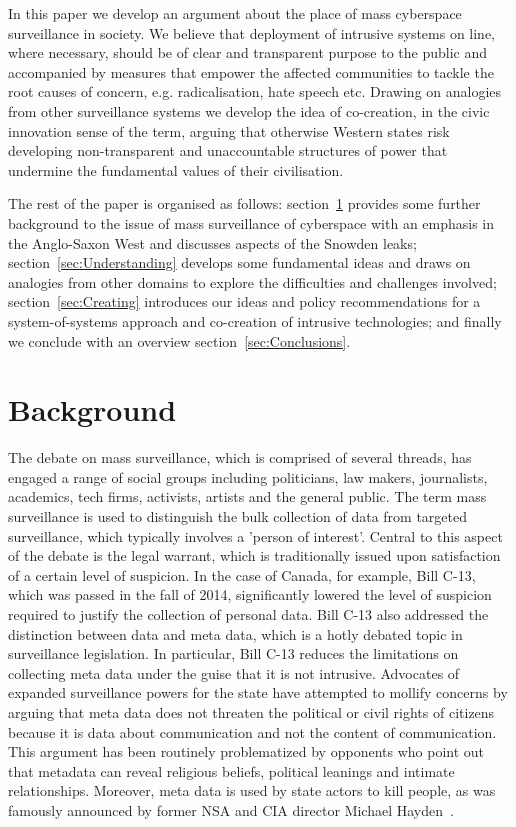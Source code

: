 \documentclass{llncs}
\begin{document}
In this paper we develop an argument about the place of mass cyberspace surveillance in society. We believe that deployment of intrusive systems on line, where necessary, should be of clear and transparent purpose to the public and accompanied by measures that empower the affected communities to tackle the root causes of concern, e.g. radicalisation, hate speech etc. Drawing on analogies from other surveillance systems we develop the idea of co-creation, in the civic innovation sense of the term, arguing that otherwise Western states risk developing non-transparent and unaccountable structures of power that undermine the fundamental values of their civilisation.

The rest of the paper is organised as follows: section~\ref{sec:Background} provides some further background to the issue of mass surveillance of cyberspace with an emphasis in the Anglo-Saxon West and discusses aspects of the Snowden leaks; section~\ref{sec:Understanding} develops some fundamental ideas and draws on analogies from other domains to explore the difficulties and challenges involved; section~\ref{sec:Creating} introduces our ideas and policy recommendations for a system-of-systems approach and co-creation of intrusive technologies; and finally we conclude with an overview section~\ref{sec:Conclusions}.

\section{Background}
\label{sec:Background}
The debate on mass surveillance, which is comprised of several threads, has engaged a range of social groups including politicians, law makers, journalists, academics, tech firms, activists, artists and the general public. The term mass surveillance is used to distinguish the bulk collection of data from targeted surveillance, which typically involves a 'person of interest'. Central to this aspect of the debate is the legal warrant, which is traditionally issued upon satisfaction of a certain level of suspicion. In the case of Canada, for example, Bill C-13, which was passed in the fall of 2014, significantly lowered the level of suspicion required to justify the collection of personal data. Bill C-13 also addressed the distinction between data and meta data, which is a hotly debated topic in surveillance legislation. In particular, Bill C-13 reduces the limitations on collecting meta data under the guise that it is not intrusive. Advocates of expanded surveillance powers for the state have attempted to mollify concerns by arguing that meta data does not threaten the political or civil rights of citizens because it is data about communication and not the content of communication. This argument has been routinely problematized by opponents who point out that metadata can reveal religious beliefs, political leanings and intimate relationships. Moreover, meta data is used by state actors to kill people, as was famously announced by former NSA and CIA director Michael Hayden~\cite{Hayden}. 
\end{document}
